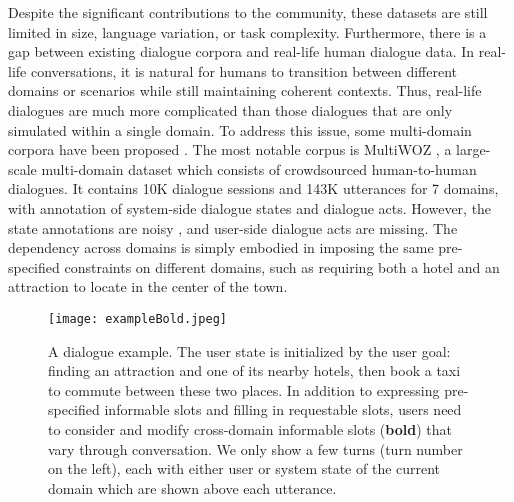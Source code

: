 Despite the significant contributions to the community, these datasets are still limited in size, language variation, or task complexity.
Furthermore, there is a gap between existing dialogue corpora and real-life human dialogue data.
In real-life conversations, it is natural for humans to transition between different domains or scenarios while still maintaining coherent contexts. Thus, real-life dialogues are much more complicated than those dialogues that are only simulated within a single domain. To address this issue, some multi-domain corpora have been proposed \cite{Multiwoz2018,SchemaGuided}. 
The most notable corpus is MultiWOZ \cite{Multiwoz2018}, a large-scale multi-domain dataset which consists of crowdsourced human-to-human dialogues. It contains 10K dialogue sessions and 143K utterances for 7 domains, with annotation of system-side dialogue states and dialogue acts. However, the state annotations are noisy \cite{eric2019multiwoz21}, and user-side dialogue acts are missing. The dependency across domains is simply embodied in imposing the same pre-specified constraints on different domains, such as requiring both a hotel and an attraction to locate in the center of the town.

\begin{figure}[htbp]
    \texttt{[image: exampleBold.jpeg]}
    \caption{A dialogue example.
    The user state is initialized by the user goal: finding an attraction and one of its nearby hotels, then book a taxi to commute between these two places. 
    In addition to expressing pre-specified informable slots and filling in requestable slots, users need to consider and modify cross-domain informable slots (\textbf{bold}) that vary through conversation.
    We only show a few turns (turn number on the left), each with either user or system state of the current domain which are shown above each utterance.
    }
    \label{fig:example}
\end{figure}

